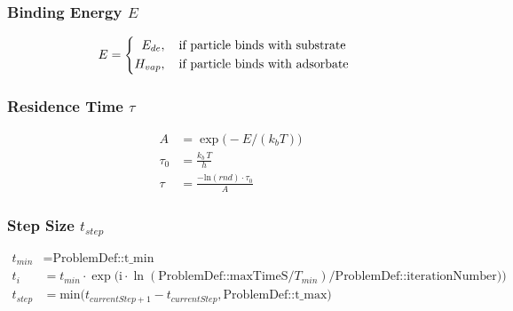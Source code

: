 \subsubsection*{Binding Energy $E$}
\begin{equation}
	\label{eq:energy}
	E=
	\begin{cases}
		\begin{split}
		E_{de}&, \text{\quad if particle binds with substrate}\\
		H_{vap}&,  \text{\quad if particle binds with adsorbate}
		\end{split}
	\end{cases}
\end{equation}


\subsubsection*{Residence Time $\tau$}
\begin{equation}
	\label{eq:sojourntime}
	\begin{split}
		A&=\exp\big( - E/(k_b T)\big)\\
		\tau_0 &= \frac{k_b \, T}{h}\\
		\tau &= \frac{-\text{ln}(rnd) \cdot \tau_0}{A}
	\end{split}
\end{equation}
%
\subsubsection*{Step Size $t_{step}$}
\begin{equation}
	\label{eq:tstep}
	\begin{split}
	t_{min}&=\text{ProblemDef::t\_min}\\
	t_{i}&=t_{min} \cdot \exp\big(\text{i}\cdot \ln(\text{ProblemDef::maxTimeS}/T_{min})/\text{ProblemDef::iterationNumber})\big)\\
	t_{step}&=\text{min}\big(t_{currentStep+1}-t_{currentStep}, \text{ProblemDef::t\_max}\big)\\
	\end{split}
\end{equation}

